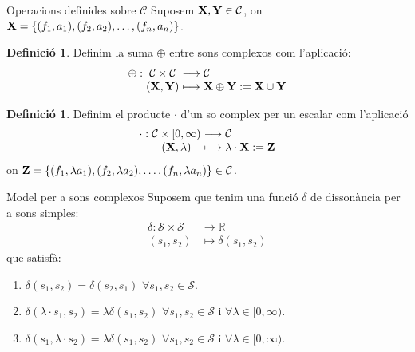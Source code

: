 \documentclass[10pt,hyperref={colorlinks,linkcolor=black,citecolor=blue!80,urlcolor=blue!60},handout]{beamer} %
\theoremstyle{definition}
\newtheorem{defin}[theorem]{Definició}
\newcommand{\0}{\ensuremath{\vb{0}}}
\newcommand{\X}{\ensuremath{\vb{X}}}
\newcommand{\Y}{\ensuremath{\vb{Y}}}
\newcommand{\Z}{\ensuremath{\vb{Z}}}
\newcommand{\RR}{\ensuremath{\mathbb{R}}} %
\begin{document}
\begin{frame}{Operacions definides sobre $\mathcal{C}$}
    Suposem $\X,\Y\in\mathcal{C}$, on $\X=\{(f_1,a_1),(f_2,a_2),\ldots,(f_n,a_n)\}$.\par\pause
    \begin{defin}
        Definim la suma $\oplus$ entre sons complexos com l'aplicació:
        $$\begin{array}{r@{\hspace{0.5\tabcolsep}}c@{\hspace{0.5\tabcolsep}}c@{\hspace{0.5\tabcolsep}}l}
            \oplus:&\mathcal{C}\times\mathcal{C}&\longrightarrow&\mathcal{C}\\
            &(\X,\Y)&\longmapsto&\X\oplus \Y:=\X\cup\Y
        \end{array}$$
    \end{defin}\pause
    \begin{defin}
        Definim el producte $\cdot$ d'un so complex per un escalar com l'aplicació
        $$\begin{array}{r@{\hspace{0.5\tabcolsep}}c@{\hspace{0.5\tabcolsep}}c@{\hspace{0.5\tabcolsep}}l}
            \cdot:&\mathcal{C}\times[0,\infty)&\longrightarrow&\mathcal{C}\\
            &(\X,\lambda)&\longmapsto&\lambda\cdot \X:=\Z
        \end{array}$$
        on $\Z=\{(f_1,\lambda a_1),(f_2,\lambda a_2),\ldots,(f_n,\lambda a_n)\}\in\mathcal{C}$.
    \end{defin}  
\end{frame}
\begin{frame}{Model per a sons complexos}
    Suposem que tenim una funció $\delta$ de dissonància per a sons simples:
    \begin{align*}
        \delta:\mathcal{S}\times\mathcal{S}&\longrightarrow\RR\\
        (s_1,s_2)&\longmapsto\delta(s_1,s_2)
    \end{align*}
    que satisfà:
    \begin{enumerate}
        \item $\delta(s_1,s_2)=\delta(s_2,s_1)$ $\forall s_1,s_2\in\mathcal{S}$.\pause
        \item $\delta(\lambda\cdot s_1,s_2)=\lambda\delta(s_1,s_2)$ $\forall s_1,s_2\in\mathcal{S}$ i $\forall\lambda\in[0,\infty)$.\pause
        \item $\delta(s_1,\lambda\cdot s_2)=\lambda\delta(s_1,s_2)$ $\forall s_1,s_2\in\mathcal{S}$ i $\forall \lambda\in[0,\infty)$.
    \end{enumerate}
\end{frame}
\end{document}
